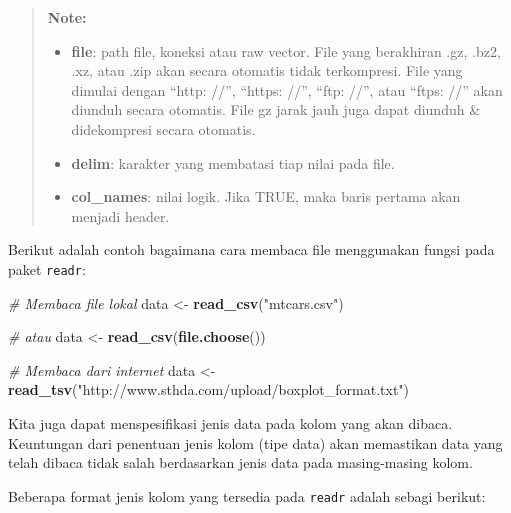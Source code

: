 \documentclass[]{book}
\newenvironment{Shaded}{\begin{snugshade}}{\end{snugshade}}
\newcommand{\KeywordTok}[1]{\textcolor[rgb]{0.13,0.29,0.53}{\textbf{#1}}}
\newcommand{\StringTok}[1]{\textcolor[rgb]{0.31,0.60,0.02}{#1}}
\newcommand{\CommentTok}[1]{\textcolor[rgb]{0.56,0.35,0.01}{\textit{#1}}}
\newcommand{\NormalTok}[1]{#1}
\providecommand{\tightlist}{%
  \setlength{\itemsep}{0pt}\setlength{\parskip}{0pt}}
\begin{document}
\begin{quote}
\textbf{Note: }

\begin{itemize}
\tightlist
\item
  \textbf{file}: path file, koneksi atau raw vector. File yang
  berakhiran .gz, .bz2, .xz, atau .zip akan secara otomatis tidak
  terkompresi. File yang dimulai dengan ``http: //'', ``https: //'',
  ``ftp: //'', atau ``ftps: //'' akan diunduh secara otomatis. File gz
  jarak jauh juga dapat diunduh \& didekompresi secara otomatis.
\item
  \textbf{delim}: karakter yang membatasi tiap nilai pada file.
\item
  \textbf{col\_names}: nilai logik. Jika TRUE, maka baris pertama akan
  menjadi header.
\end{itemize}
\end{quote}

Berikut adalah contoh bagaimana cara membaca file menggunakan fungsi
pada paket \texttt{readr}:

\begin{Shaded}
\begin{Highlighting}[]
\CommentTok{# Membaca file lokal}
\NormalTok{data <-}\StringTok{ }\KeywordTok{read_csv}\NormalTok{(}\StringTok{"mtcars.csv"}\NormalTok{)}

\CommentTok{# atau}
\NormalTok{data <-}\StringTok{ }\KeywordTok{read_csv}\NormalTok{(}\KeywordTok{file.choose}\NormalTok{())}

\CommentTok{# Membaca dari internet}
\NormalTok{data <-}\StringTok{ }\KeywordTok{read_tsv}\NormalTok{(}\StringTok{"http://www.sthda.com/upload/boxplot_format.txt"}\NormalTok{)}
\end{Highlighting}
\end{Shaded}

Kita juga dapat menspesifikasi jenis data pada kolom yang akan dibaca.
Keuntungan dari penentuan jenis kolom (tipe data) akan memastikan data
yang telah dibaca tidak salah berdasarkan jenis data pada masing-masing
kolom.

Beberapa format jenis kolom yang tersedia pada \texttt{readr} adalah
sebagi berikut:
\end{document}
